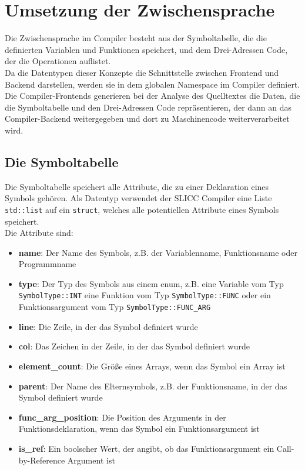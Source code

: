 \chapter{Umsetzung der Zwischensprache}
\label{chap:build:inBetweenState}

Die Zwischensprache im Compiler besteht aus der Symboltabelle, die die definierten Variablen und Funktionen speichert, und dem Drei-Adressen Code, der die Operationen auflistet.\\
Da die Datentypen dieser Konzepte die Schnittstelle zwischen Frontend und Backend darstellen, werden sie in dem globalen Namespace im Compiler definiert.
Die Compiler-Frontends generieren bei der Analyse des Quelltextes die Daten, die die Symboltabelle und den Drei-Adressen Code repräsentieren, der dann an das Compiler-Backend weitergegeben und dort zu Maschinencode weiterverarbeitet wird.\\


\section{Die Symboltabelle}

Die Symboltabelle speichert alle Attribute, die zu einer Deklaration eines Symbols gehören.
Als Datentyp verwendet der \ac{SLICC} Compiler eine Liste \texttt{std::list} auf ein \texttt{struct}, welches alle potentiellen Attribute eines Symbols speichert.\\
Die Attribute sind:

\begin{itemize}
  \item \textbf{name}: Der Name des Symbols, z.B. der Variablenname, Funktionsname oder Programmname
  \item \textbf{type}: Der Typ des Symbols aus einem enum, z.B. eine Variable vom Typ \texttt{SymbolType::INT} eine Funktion vom Typ \texttt{SymbolType::FUNC} oder ein Funktionsargument vom Typ \texttt{SymbolType::FUNC_ARG}
  \item \textbf{line}: Die Zeile, in der das Symbol definiert wurde
  \item \textbf{col}: Das Zeichen in der Zeile, in der das Symbol definiert wurde
  \item \textbf{element\_count}: Die Größe eines Arrays, wenn das Symbol ein Array ist
  \item \textbf{parent}: Der Name des Elternsymbols, z.B. der Funktionsname, in der das Symbol definiert wurde
  \item \textbf{func\_arg\_position}: Die Position des Arguments in der Funktionsdeklaration, wenn das Symbol ein Funktionsargument ist
  \item \textbf{is\_ref}: Ein boolscher Wert, der angibt, ob das Funktionsargument ein Call-by-Reference Argument ist
\end{itemize}

